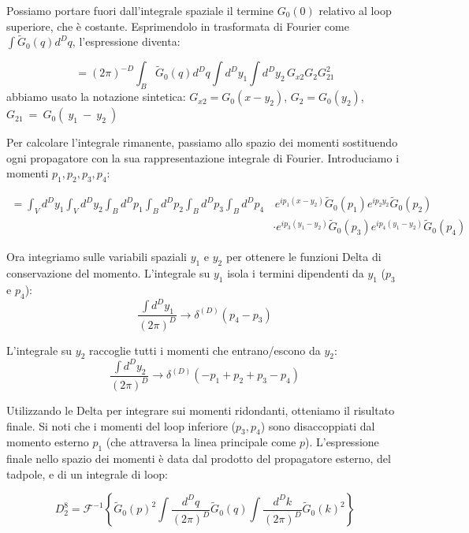 \noindent Possiamo portare fuori dall'integrale spaziale il termine $G_0(0)$ relativo al loop superiore, che è costante.
Esprimendolo in trasformata di Fourier come $\int \tilde{G}_0(q) d^D q$, l'espressione diventa:

\begin{equation}
= (2\pi)^{-D} \int_B \tilde{G}_0(q) d^D q \int d^D y_1 \int d^D y_2 \, G_{x2} G_{2} G_{21}^2
\end{equation}
abbiamo usato la notazione sintetica: $G_{x2} = G_0(x-y_2)$, $G_2 = G_0(y_2)$, $G_{21}~=~G_0(~y_1~-~y_2~)$

\noindent Per calcolare l'integrale rimanente, passiamo allo spazio dei momenti sostituendo ogni propagatore con la sua rappresentazione integrale di Fourier. Introduciamo i momenti $p_1, p_2, p_3, p_4$:

\begin{align*}
 =\int_V d^D y_1 \int_V d^D y_2 \int_B d^D p_1 \int_B d^D p_2 \int_B d^D p_3 \int_B d^D p_4 & \, e^{i p_1 (x-y_2)} \tilde{G}_0(p_1) e^{i p_2 y_2} \tilde{G}_0(p_2) \\ &\cdot e^{i p_3 (y_1-y_2)} \tilde{G}_0(p_3) e^{i p_4 (y_1-y_2)} \tilde{G}_0(p_4)
\end{align*}

\noindent Ora integriamo sulle variabili spaziali $y_1$ e $y_2$ per ottenere le funzioni Delta di conservazione del momento. L'integrale su $y_1$ isola i termini dipendenti da $y_1$ ($p_3$ e $p_4$):
\begin{equation}
\frac{\int d^D y_1}{(2\pi)^D} \longrightarrow \delta^{(D)}(p_4 - p_3)
\end{equation}


\noindent L'integrale su $y_2$ raccoglie tutti i momenti che entrano/escono da $y_2$:
\begin{equation}
\frac{\int d^D y_2}{(2\pi)^D} \longrightarrow \delta^{(D)}(-p_1 + p_2 + p_3 - p_4)
\end{equation}

\noindent Utilizzando le Delta per integrare sui momenti ridondanti, otteniamo il risultato finale.
Si noti che i momenti del loop inferiore ($p_3, p_4$) sono disaccoppiati dal momento esterno $p_1$ (che attraversa la linea principale come $p$).
L'espressione finale nello spazio dei momenti è data dal prodotto del propagatore esterno, del tadpole, e di un integrale di loop:

\begin{equation}
D_2^{8} = \mathcal{F}^{-1} \left\{  \tilde{G}_0(p)^2 \int \frac{d^D q}{(2\pi)^D} \tilde{G}_0(q) \int \frac{d^D k}{(2\pi)^D} \tilde{G}_0(k)^2 \right\}
\end{equation}


